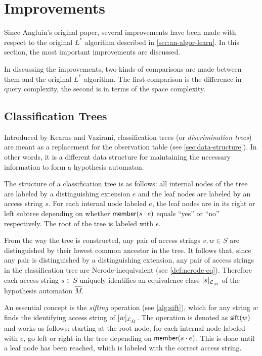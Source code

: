 \section{Improvements}
\label{sec:improvements}
Since Angluin's original paper, several improvements have been made with respect
to the original $L^*$ algorithm described in \cref{sec:an-algor-learn}. In this
section, the most important improvements are discussed.

In discussing the improvements, two kinds of comparisons are made between them
and the original $L^*$ algorithm. The first comparison is the difference in
query complexity, the second is in terms of the space complexity.

\subsection{Classification Trees}
\label{sec:classification-trees}
Introduced by Kearns and Vazirani\cite{Kearns1994}, classification trees (or
\textit{discrimination trees}) are meant as a replacement for the observation
table (see \cref{sec:data-structure}). In other words, it is a different data
structure for maintaining the necessary information to form a hypothesis
automaton.

The structure of a classification tree is as follows: all internal nodes of the
tree are labeled by a distinguishing extension $e$ and the leaf nodes are
labeled by an access string $s$. For each internal node labeled $e$, the leaf
nodes are in its right or left subtree depending on whether $\mathsf{member}(s\cdot e)$
equals ``yes'' or ``no'' respectively. The root of the tree is labeled with
$\epsilon$.

From the way the tree is constructed, any pair of access strings $v,w \in S$ are
distinguished by their lowest common ancestor in the tree. It follows that,
since any pair is distinguished by a distinguishing extension, any pair of
access strings in the classification tree are Nerode-inequivalent (see
\cref{def:nerode-eq}). Therefore each access string $s \in S$ uniquely
identifies an equivalence class $[s]_{\mathcal{L}_{\hat M}}$ of the hypothesis
automaton $\hat M$.

An essential concept is the \textit{sifting} operation (see \cref{alg:sift}),
which for any string $w$ finds the identifying access string of
$[w]_{\mathcal{L}_{\hat M}}$. The operation is denoted as $\mathsf{sift}(w)$ and works as
follows: starting at the root node, for each internal node labeled with $e$, go
left or right in the tree depending on $\mathsf{member}(s \cdot e)$. This is done until a
leaf node has been reached, which is labeled with the correct access string.

